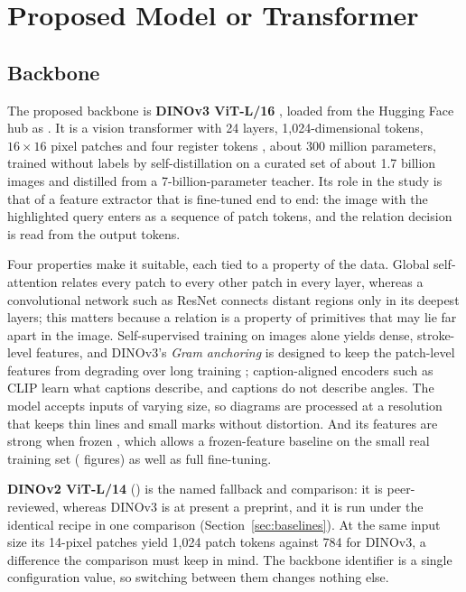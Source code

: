 \section{Proposed Model or Transformer}
\label{sec:model}

\subsection{Backbone}

The proposed backbone is \textbf{DINOv3 ViT-L/16} \cite{simeoni2025dinov3}, loaded from the Hugging Face hub as \texttt{\backboneId}. It is a vision transformer \cite{dosovitskiy2021vit} with 24 layers, 1,024-dimensional tokens, $16\times16$ pixel patches and four register tokens \cite{darcet2024registers}, about 300 million parameters, trained without labels by self-distillation on a curated set of about 1.7 billion images and distilled from a 7-billion-parameter teacher. Its role in the study is that of a feature extractor that is fine-tuned end to end: the image with the highlighted query enters as a sequence of patch tokens, and the relation decision is read from the output tokens.

Four properties make it suitable, each tied to a property of the data. Global self-attention relates every patch to every other patch in every layer, whereas a convolutional network such as ResNet \cite{he2016resnet} connects distant regions only in its deepest layers; this matters because a relation is a property of primitives that may lie far apart in the image. Self-supervised training on images alone yields dense, stroke-level features, and DINOv3's \emph{Gram anchoring} is designed to keep the patch-level features from degrading over long training \cite{simeoni2025dinov3}; caption-aligned encoders such as CLIP \cite{radford2021clip} learn what captions describe, and captions do not describe angles. The model accepts inputs of varying size, so diagrams are processed at a resolution that keeps thin lines and small marks without distortion. And its features are strong when frozen \cite{oquab2024dinov2,simeoni2025dinov3}, which allows a frozen-feature baseline on the small real training set (\nFiguresTrain{} figures) as well as full fine-tuning.

\textbf{DINOv2 ViT-L/14} \cite{oquab2024dinov2} (\texttt{\fallbackId}) is the named fallback and comparison: it is peer-reviewed, whereas DINOv3 is at present a preprint, and it is run under the identical recipe in one comparison (Section~\ref{sec:baselines}). At the same input size its 14-pixel patches yield 1,024 patch tokens against 784 for DINOv3, a difference the comparison must keep in mind. The backbone identifier is a single configuration value, so switching between them changes nothing else.


